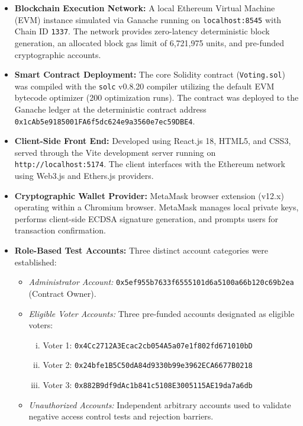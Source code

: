 \documentclass[12pt,a4paper]{report}
\begin{document}
\begin{itemize}
    \item \textbf{Blockchain Execution Network:} A local Ethereum Virtual Machine (EVM) instance simulated via Ganache running on \texttt{localhost:8545} with Chain ID \texttt{1337}. The network provides zero-latency deterministic block generation, an allocated block gas limit of 6,721,975 units, and pre-funded cryptographic accounts.
    \item \textbf{Smart Contract Deployment:} The core Solidity contract (\texttt{Voting.sol}) was compiled with the \texttt{solc} v0.8.20 compiler utilizing the default EVM bytecode optimizer (200 optimization runs). The contract was deployed to the Ganache ledger at the deterministic contract address \texttt{0x1cAb5e9185001FA6f5dc624e9a3560e7ec59DBE4}.
    \item \textbf{Client-Side Front End:} Developed using React.js 18, HTML5, and CSS3, served through the Vite development server running on \texttt{http://localhost:5174}. The client interfaces with the Ethereum network using Web3.js and Ethers.js providers.
    \item \textbf{Cryptographic Wallet Provider:} MetaMask browser extension (v12.x) operating within a Chromium browser. MetaMask manages local private keys, performs client-side ECDSA signature generation, and prompts users for transaction confirmation.
    \item \textbf{Role-Based Test Accounts:} Three distinct account categories were established:
    \begin{itemize}
        \item \emph{Administrator Account:} {\footnotesize \texttt{0x5ef955b7633f6555101d6a5100a66b120c69b2ea}} (Contract Owner).
        \item \emph{Eligible Voter Accounts:} Three pre-funded accounts designated as eligible voters:
        \begin{enumerate}[i.]
            \item Voter 1: {\footnotesize \texttt{0x4Cc2712A3Ecac2cb054A5a07e1f802fd671010bD}}
            \item Voter 2: {\footnotesize \texttt{0x24bfe1B5C50dA84d9330b99e3962ECA6677B0218}}
            \item Voter 3: {\footnotesize \texttt{0x882B9df9dAc1b841c5108E3005115AE19da7a6db}}
        \end{enumerate}
        \item \emph{Unauthorized Accounts:} Independent arbitrary accounts used to validate negative access control tests and rejection barriers.
    \end{itemize}
\end{itemize}
\end{document}
